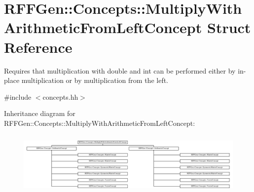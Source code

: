 \hypertarget{structRFFGen_1_1Concepts_1_1MultiplyWithArithmeticFromLeftConcept}{\section{R\-F\-F\-Gen\-:\-:Concepts\-:\-:Multiply\-With\-Arithmetic\-From\-Left\-Concept Struct Reference}
\label{structRFFGen_1_1Concepts_1_1MultiplyWithArithmeticFromLeftConcept}
}


Requires that multiplication with double and int can be performed either by in-\/place multiplication or by multiplication from the left.  




{\ttfamily \#include $<$concepts.\-hh$>$}

Inheritance diagram for R\-F\-F\-Gen\-:\-:Concepts\-:\-:Multiply\-With\-Arithmetic\-From\-Left\-Concept\-:\begin{figure}[H]
\begin{center}
\leavevmode
\includegraphics[height=3.172805cm]{structRFFGen_1_1Concepts_1_1MultiplyWithArithmeticFromLeftConcept}
\end{center}
\end{figure}
